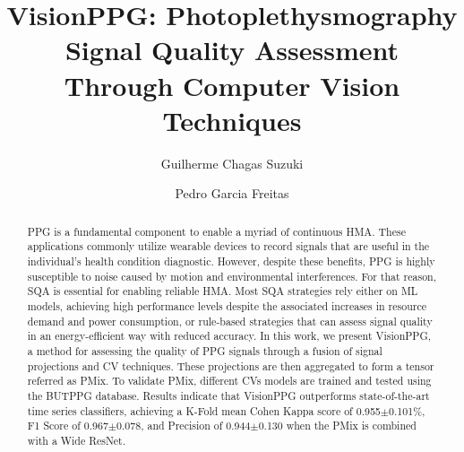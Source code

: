 \documentclass[final,3p,times,twocolumn]{elsarticle}
\begin{document}
\begin{frontmatter}

\title{VisionPPG: Photoplethysmography Signal Quality Assessment Through Computer Vision Techniques}

\author[1]{Guilherme Chagas Suzuki}


\author[1]{Pedro Garcia Freitas}






\begin{abstract}


\gls{PPG} is a fundamental component to enable a myriad of continuous \gls{HMA}. 
These applications commonly utilize wearable devices to record signals that are useful in the individual's health condition diagnostic.
However, despite these benefits, \gls{PPG} is highly susceptible to noise caused by motion and environmental interferences.
For that reason, \gls{SQA} is essential for enabling reliable \gls{HMA}.
Most \gls{SQA} strategies rely either on \gls{ML} models, achieving high performance levels despite the associated increases in resource demand and power consumption, or rule-based strategies that can assess signal quality in an energy-efficient way with reduced accuracy. 
In this work, we present VisionPPG, a method for assessing the quality of \gls{PPG} signals through a fusion of signal projections and \gls{CV} techniques.
These projections are then aggregated to form a tensor referred as \gls{PMix}.
To validate \gls{PMix}, different \glspl{CV} models are trained and tested using the \gls{BUTPPG} database. 
Results indicate that VisionPPG outperforms state-of-the-art time series classifiers, achieving a K-Fold mean Cohen Kappa score of 0.955$\pm$0.101\%, F1 Score of 0.967$\pm$0.078, and Precision of 0.944$\pm$0.130 when the \gls{PMix} is combined with a Wide ResNet.
\end{abstract}


\end{frontmatter}
\end{document}
